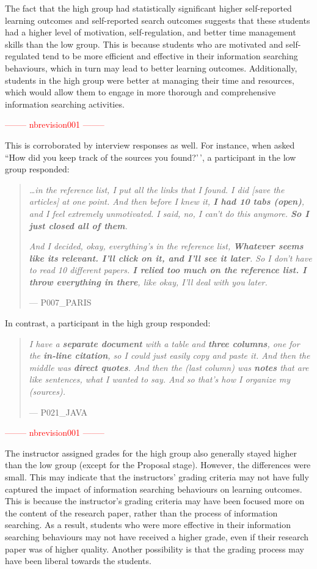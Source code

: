 \documentclass[letterpaper, nobind]{templates/ociamthesis}
\begin{document}
The fact that the high group had statistically significant higher self-reported learning outcomes and self-reported search outcomes suggests that these students had a higher level of motivation, self-regulation, and better time management skills than the low group.
This is because students who are motivated and self-regulated tend to be more efficient and effective in their information searching behaviours, which in turn may lead to better learning outcomes.
Additionally, students in the high group were better at managing their time and resources, which would allow them to engage in more thorough and comprehensive information searching activities.

\textcolor{red}{-------- nbrevision001 --------}

This is corroborated by interview responses as well.
For instance, when asked ``How did you keep track of the sources you found?'\,', a participant in the low group responded:

\begin{quote}
\emph{\ldots in the reference list, I put all the links that I found. I did {[}save the articles{]} at one point. And then before I knew it, \textbf{I had 10 tabs (open)}, and I feel extremely unmotivated. I said, no, I can't do this anymore. \textbf{So I just closed all of them}.}

\emph{And I decided, okay, everything's in the reference list, \textbf{Whatever seems like its relevant. I'll click on it, and I'll see it later}. So I don't have to read 10 different papers. \textbf{I relied too much on the reference list. I throw everything in there}, like okay, I'll deal with you later.}

\hfill --- P007\_PARIS
\end{quote}

In contrast, a participant in the high group responded:

\begin{quote}
\emph{I have a \textbf{separate document} with a table and \textbf{three columns}, one for the \textbf{in-line citation}, so I could just easily copy and paste it. And then the middle was \textbf{direct quotes}. And then the (last column) was \textbf{notes} that are like sentences, what I wanted to say. And so that's how I organize my (sources).}

\hfill --- P021\_JAVA
\end{quote}

\textcolor{red}{-------- nbrevision001 --------}

The instructor assigned grades for the high group also generally stayed higher than the low group (except for the Proposal stage). However, the differences were small.
This may indicate that the instructors' grading criteria may not have fully captured the impact of information searching behaviours on learning outcomes.
This is because the instructor's grading criteria may have been focused more on the content of the research paper, rather than the process of information searching. As a result, students who were more effective in their information searching behaviours may not have received a higher grade, even if their research paper was of higher quality.
Another possibility is that the grading process may have been liberal towards the students.
\end{document}
